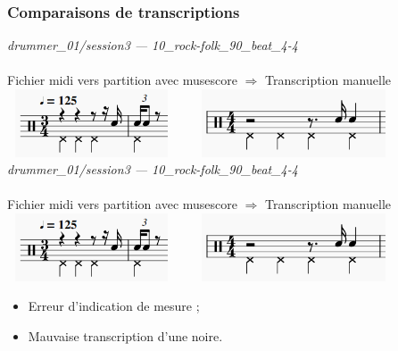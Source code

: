 \subsubsection{Comparaisons de transcriptions}
\textit{drummer\_01/session3 — 10\_rock-folk\_90\_beat\_4-4}\\\\
Fichier midi vers partition avec musescore $\Rightarrow$ Transcription manuelle\\
\includegraphics[height=20mm, width=50mm]{z_images/transcriptions_manuelles/0_prise_en_main/0_tests_drummer_01__session3/musescore_0.png}\ \ \ \ 
\includegraphics[height=20mm, width=55mm]{z_images/transcriptions_manuelles/0_prise_en_main/0_tests_drummer_01__session3/manuel_0.png}
\textit{drummer\_01/session3 — 10\_rock-folk\_90\_beat\_4-4}\\\\
Fichier midi vers partition avec musescore $\Rightarrow$ Transcription manuelle\\
\includegraphics[height=20mm, width=50mm]{z_images/transcriptions_manuelles/0_prise_en_main/0_tests_drummer_01__session3/musescore_0.png}\ \ \ \ 
\includegraphics[height=20mm, width=55mm]{z_images/transcriptions_manuelles/0_prise_en_main/0_tests_drummer_01__session3/manuel_0.png}
\begin{itemize}
	\item Erreur d’indication de mesure ;
	\item Mauvaise transcription d’une noire.\\
\end{itemize}
